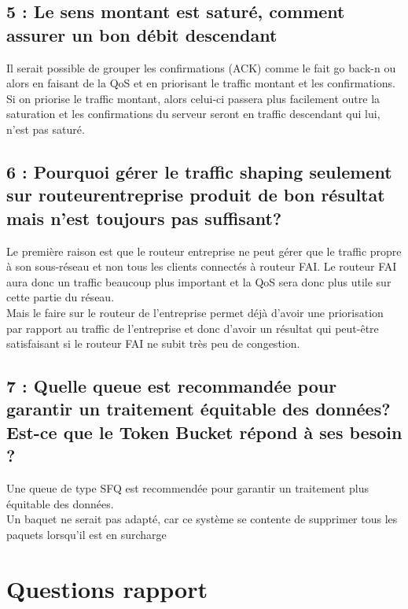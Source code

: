 \documentclass{article}
\begin{document}
\subsection*{5 : Le sens montant est saturé, comment assurer un bon débit descendant}

Il serait possible de grouper les confirmations (ACK) comme le fait go back-n\cite{GoBackN} ou alors en faisant de la QoS et en priorisant le traffic montant et les confirmations.\\

Si on priorise le traffic montant, alors celui-ci passera plus facilement outre la saturation et les confirmations du serveur seront en traffic descendant qui lui, n'est pas saturé.


\subsection*{6 : Pourquoi gérer le traffic shaping seulement sur routeurentreprise produit de bon résultat mais n'est toujours pas suffisant?}

Le première raison est que le routeur entreprise ne peut gérer que le traffic propre à son sous-réseau et non tous les clients connectés à routeur FAI. Le routeur FAI aura donc un traffic beaucoup plus important et la QoS sera donc plus utile sur cette partie du réseau.\\

Mais le faire sur le routeur de l'entreprise permet déjà d'avoir une priorisation par rapport au traffic de l'entreprise et donc d'avoir un résultat qui peut-être satisfaisant si le routeur FAI ne subit très peu de congestion.

\subsection*{7 : Quelle queue est recommandée pour garantir un traitement équitable des données? Est-ce que le Token Bucket répond à ses besoin ?}

Une queue de type SFQ \cite{SFQ} est recommendée pour garantir un traitement plus équitable des données.\\

Un baquet ne serait pas adapté, car ce système se contente de supprimer tous les paquets lorsqu'il est en surcharge \cite{Bucket}


\section{Questions rapport}
\end{document}
